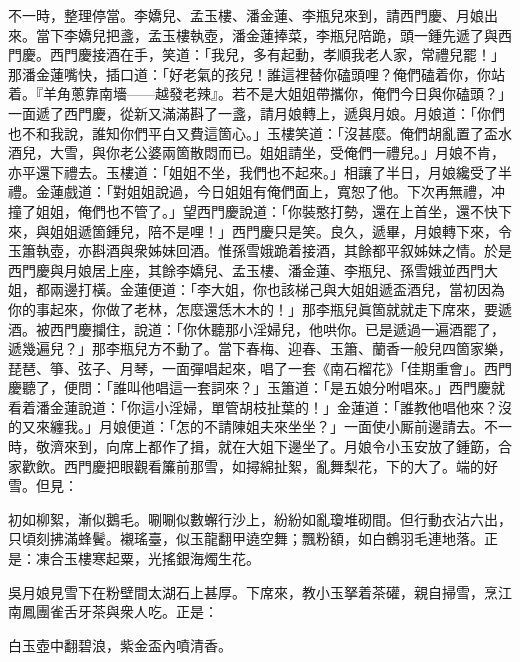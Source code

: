 不一時，整理停當。李嬌兒、孟玉樓、潘金蓮、李瓶兒來到，請西門慶、月娘出來。當下李嬌兒把盞，孟玉樓執壺，潘金蓮捧菜，李瓶兒陪跪，頭一鍾先遞了與西門慶。西門慶接酒在手，笑道：「我兒，多有起動，孝順我老人家，常禮兒罷！」那潘金蓮嘴快，插口道：「好老氣的孩兒！誰這裡替你磕頭哩？俺們磕着你，你站着。『羊角蔥靠南墻——越發老辣』。若不是大姐姐帶攜你，俺們今日與你磕頭？」一面遞了西門慶，從新又滿滿斟了一盞，請月娘轉上，遞與月娘。月娘道：「你們也不和我說，誰知你們平白又費這箇心。」玉樓笑道：「沒甚麼。俺們胡亂置了盃水酒兒，大雪，與你老公婆兩箇散悶而已。姐姐請坐，受俺們一禮兒。」月娘不肯，亦平還下禮去。玉樓道：「姐姐不坐，我們也不起來。」相讓了半日，月娘纔受了半禮。金蓮戲道：「對姐姐說過，今日姐姐有俺們面上，寬恕了他。下次再無禮，冲撞了姐姐，俺們也不管了。」{}望西門慶說道：「你裝憨打勢，還在上首坐，還不快下來，與姐姐遞箇鍾兒，陪不是哩！」西門慶只是笑。良久，遞畢，月娘轉下來，令玉簫執壺，亦斟酒與衆姊妹回酒。惟孫雪娥跪着接酒，其餘都平叙姊妹之情。於是西門慶與月娘居上座，其餘李嬌兒、孟玉樓、潘金蓮、李瓶兒、孫雪娥並西門大姐，都兩邊打橫。金蓮便道：「李大姐，你也該梯己與大姐姐遞盃酒兒，當初因為你的事起來，你做了老林，怎麼還恁木木的！」{}那李瓶兒眞箇就就走下席來，要遞酒。{}被西門慶攔住，說道：「你休聽那小淫婦兒，他哄你。{}已是遞過一遍酒罷了，遞幾遍兒？」那李瓶兒方不動了。當下春梅、迎春、玉簫、蘭香一般兒四箇家樂，琵琶、箏、弦子、月琴，一面彈唱起來，唱了一套《南石榴花》「佳期重會」。{}西門慶聽了，便問：「誰叫他唱這一套詞來？」玉簫道：「是五娘分咐唱來。」西門慶就看着潘金蓮說道：{}「你這小淫婦，單管胡枝扯葉的！」金蓮道：「誰教他唱他來？沒的又來纏我。」月娘便道：「怎的不請陳姐夫來坐坐？」一面使小厮前邊請去。不一時，敬濟來到，向席上都作了揖，就在大姐下邊坐了。月娘令小玉安放了鍾筯，合家歡飲。西門慶把眼觀看簾前那雪，如撏綿扯絮，亂舞梨花，下的大了。端的好雪。但見：

\begin{myquote} 
初如柳絮，漸似鵝毛。唰唰似數蠏行沙上，紛紛如亂瓊堆砌間。但行動衣沾六出，只頃刻拂滿蜂鬢。襯瑤臺，似玉龍翻甲遶空舞；飄粉額，如白鶴羽毛連地落。正是：凍合玉樓寒起粟，光搖銀海燭生花。
\end{myquote} 

吳月娘見雪下在粉壁間太湖石上甚厚。下席來，教小玉拏着茶礶，親自掃雪，烹江南鳳團雀舌牙茶與衆人吃。正是：

\begin{myquote} 
白玉壺中翻碧浪，紫金盃內噴清香。
\end{myquote} 

